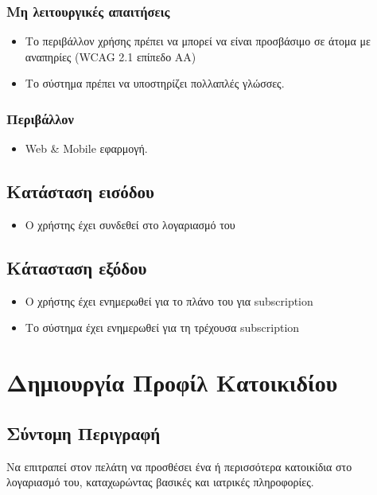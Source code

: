 \documentclass[12pt,a4paper,twoside]{book}
\begin{document}
\subsubsection{Μη λειτουργικές απαιτήσεις}
\begin{itemize}
  \item Το περιβάλλον χρήσης πρέπει να μπορεί να  είναι προσβάσιμο σε  άτομα με αναπηρίες (WCAG 2.1 επίπεδο AA) %
  \item Το σύστημα πρέπει να υποστηρίζει πολλαπλές γλώσσες.
\end{itemize}

\subsubsection{Περιβάλλον}
\begin{itemize}
  \item Web \& Mobile εφαρμογή.
\end{itemize}

\subsection{Κατάσταση εισόδου} %
\begin{itemize}
  \item Ο χρήστης έχει συνδεθεί στο λογαριασμό του %
\end{itemize}

\subsection{Κάτασταση εξόδου} %
\begin{itemize}
  \item Ο χρήστης έχει ενημερωθεί για το πλάνο του για subscription
  \item Το σύστημα έχει ενημερωθεί για τη τρέχουσα subscription
\end{itemize}


\section{Δημιουργία Προφίλ Κατοικιδίου} %

\subsection{Σύντομη Περιγραφή}
Να επιτραπεί στον πελάτη να προσθέσει ένα ή περισσότερα κατοικίδια στο λογαριασμό του, καταχωρώντας βασικές και ιατρικές πληροφορίες. %
\end{document}
